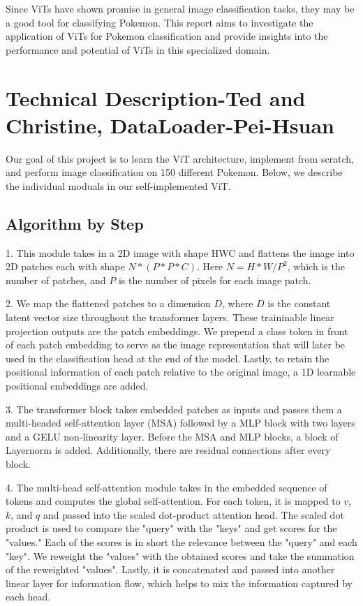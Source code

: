 \documentclass{article} %
\begin{document}
Since ViTs have shown promise in general image classification tasks, they may be a good 
tool for classifying Pokemon. This report aims to investigate the application of ViTs for 
Pokemon classification and provide insights into the performance and potential of ViTs in 
this specialized domain.

\section{Technical Description-Ted and Christine, DataLoader-Pei-Hsuan}
\label{gen_inst}

Our goal of this project is to learn the ViT architecture, implement from scratch, and
perform image classification on 150 different Pokemon. Below, we describe the individual 
moduals in our self-implemented ViT.

\subsection{Algorithm by Step}

1. This module takes in a 2D image with shape HWC and flattens the image into 2D patches each with shape $N * (P * P * C)$.
Here $N = {H * W} / {P^2}$, which is the number of patches, and $P$ is the number of pixels for each image patch.

2. We map the flattened patches to a dimension $D$, where $D$ is the constant latent vector size throughout the transformer layers.
These traininable linear projection outputs are the patch embeddings.
We prepend a class token in front of each patch embedding to serve as the image representation that will later be used in the
classification head at the end of the model. Lastly, to retain the positional information of each patch relative to the original image,
a 1D learnable positional embeddings are added.

3. The transformer block takes embedded patches as inputs and passes them a multi-headed self-attention layer (MSA)
followed by a MLP block with two layers and a GELU non-linearity layer. Before the MSA and MLP blocks, a block of Layernorm is added.
Additionally, there are residual connections after every block.

4. The multi-head self-attention module takes in the embedded sequence of tokens and computes the global self-attention.
For each token, it is mapped to $v$, $k$, and $q$ and passed into the scaled dot-product attention head.
The scaled dot product is used to compare the "query" with the "keys" and get scores for the "values."
Each of the scores is in short the relevance between the "query" and each "key".
We reweight the "values" with the obtained scores and take the summation of the reweighted "values".
Lastly, it is concatenated and passed into another linear layer for information flow, which helps to mix the information captured by each head.
\end{document}
